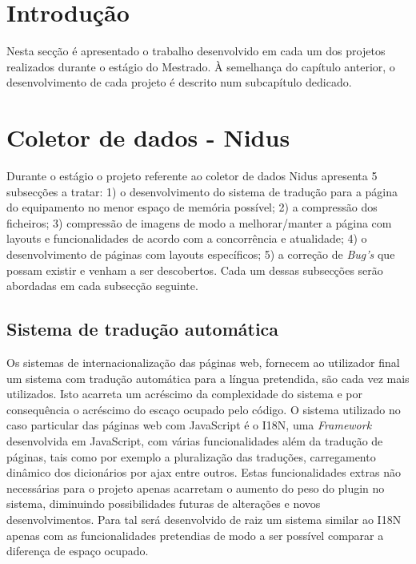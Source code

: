 \section{Introdução}
Nesta secção é apresentado  o trabalho desenvolvido em cada um dos projetos realizados durante o estágio do Mestrado. À semelhança do capítulo anterior, o desenvolvimento de cada projeto é descrito num subcapítulo dedicado.



\section{Coletor de dados - Nidus} 
\par Durante o estágio o projeto referente ao coletor de dados Nidus apresenta 5 subsecções a tratar: 1) o desenvolvimento do sistema de tradução para a página do equipamento no menor espaço de memória possível; 2) a compressão dos ficheiros; 3) compressão de imagens de modo a melhorar/manter a página com layouts e funcionalidades de acordo com a concorrência e atualidade; 4) o desenvolvimento de páginas com layouts específicos; 5) a correção de \textit{Bug's} que possam existir e venham a ser descobertos. Cada um dessas subsecções serão abordadas em cada subsecção seguinte.

\subsection{Sistema de tradução automática}\label{myi18n}
\par Os sistemas de internacionalização das páginas web, fornecem ao utilizador final um sistema com tradução automática para a língua pretendida, são cada vez mais utilizados. Isto acarreta um acréscimo da complexidade do sistema e por consequência o acréscimo do escaço ocupado pelo código. O sistema utilizado no caso particular das páginas web com JavaScript é o I18N, uma \textit{Framework} desenvolvida em JavaScript, com várias funcionalidades além da tradução de páginas, tais como por exemplo a pluralização das traduções, carregamento dinâmico dos dicionários por ajax entre outros. Estas funcionalidades extras não necessárias para o projeto apenas acarretam o aumento do peso do plugin no sistema, diminuindo possibilidades futuras de alterações e novos desenvolvimentos. Para tal será desenvolvido de raiz um sistema similar ao I18N apenas com as funcionalidades pretendias de modo a ser possível comparar a diferença de espaço ocupado.


